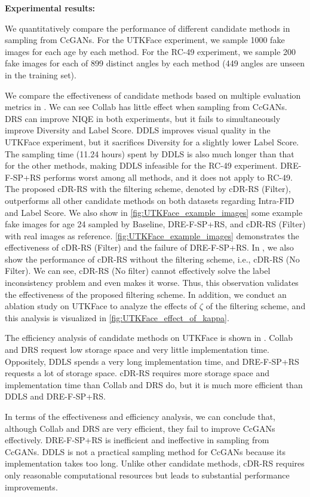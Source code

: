 \documentclass[final,12pt, 3p,times]{elsarticle}
\begin{document}
{\setlength{\parindent}{0cm}\textbf{Experimental results:}} {\color{black}
We quantitatively compare the performance of different candidate methods in sampling from CcGANs. For the UTKFace experiment, we sample 1000 fake images for each age by each method. For the RC-49 experiment, we sample 200 fake images for each of 899 distinct angles by each method (449 angles are unseen in the training set). 

We compare the effectiveness of candidate methods based on multiple evaluation metrics in . We can see Collab has little effect when sampling from CcGANs. DRS can improve NIQE in both experiments, but it fails to simultaneously improve Diversity and Label Score. DDLS improves visual quality in the UTKFace experiment, but it sacrifices Diversity for a slightly lower Label Score. The sampling time (11.24 hours) spent by DDLS is also much longer than that for the other methods, making DDLS infeasible for the RC-49 experiment. DRE-F-SP+RS performs worst among all methods, and it does not apply to RC-49. The proposed cDR-RS with the filtering scheme, denoted by cDR-RS (Filter), outperforms all other candidate methods on both datasets regarding Intra-FID and Label Score. We also show in \cref{fig:UTKFace_example_images} some example fake images for age 24 sampled by Baseline, DRE-F-SP+RS, and cDR-RS (Filter) with real images as reference. \cref{fig:UTKFace_example_images} demonstrates the effectiveness of cDR-RS (Filter) and the failure of DRE-F-SP+RS. In , we also show the performance of cDR-RS without the filtering scheme, i.e., cDR-RS (No Filter). We can see, cDR-RS (No filter) cannot effectively solve the label inconsistency problem and even makes it worse. Thus, this observation validates the effectiveness of the proposed filtering scheme. In addition, we conduct an ablation study on UTKFace to analyze the effects of $\zeta$ of the filtering scheme, and this analysis is visualized in \cref{fig:UTKFace_effect_of_kappa}. 

The efficiency analysis of candidate methods on UTKFace is shown in . Collab and DRS request low storage space and very little implementation time. Oppositely, DDLS spends a very long implementation time, and DRE-F-SP+RS requests a lot of storage space. cDR-RS requires more storage space and implementation time than Collab and DRS do, but it is much more efficient than DDLS and DRE-F-SP+RS.

In terms of the effectiveness and efficiency analysis, we can conclude that, although Collab and DRS are very efficient, they fail to improve CcGANs effectively. DRE-F-SP+RS is inefficient and ineffective in sampling from CcGANs. DDLS is not a practical sampling method for CcGANs because its implementation takes too long. Unlike other candidate methods, cDR-RS requires only reasonable computational resources but leads to substantial performance improvements.






}
\end{document}
